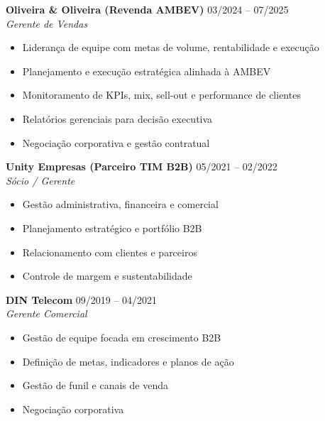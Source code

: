 \documentclass[11pt,a4paper]{article}
\begin{document}
\vspace{6pt}

\textbf{Oliveira \& Oliveira (Revenda AMBEV)} \hfill {\color{Muted}03/2024 -- 07/2025} \\
\textit{Gerente de Vendas}

\begin{itemize}[leftmargin=1.4em]
\item Liderança de equipe com metas de volume, rentabilidade e execução
\item Planejamento e execução estratégica alinhada à AMBEV
\item Monitoramento de KPIs, mix, sell-out e performance de clientes
\item Relatórios gerenciais para decisão executiva
\item Negociação corporativa e gestão contratual
\end{itemize}

\vspace{6pt}

\textbf{Unity Empresas (Parceiro TIM B2B)} \hfill {\color{Muted}05/2021 -- 02/2022} \\
\textit{Sócio / Gerente}

\begin{itemize}[leftmargin=1.4em]
\item Gestão administrativa, financeira e comercial
\item Planejamento estratégico e portfólio B2B
\item Relacionamento com clientes e parceiros
\item Controle de margem e sustentabilidade
\end{itemize}

\vspace{6pt}

\textbf{DIN Telecom} \hfill {\color{Muted}09/2019 -- 04/2021} \\
\textit{Gerente Comercial}

\begin{itemize}[leftmargin=1.4em]
\item Gestão de equipe focada em crescimento B2B
\item Definição de metas, indicadores e planos de ação
\item Gestão de funil e canais de venda
\item Negociação corporativa
\end{itemize}

\vspace{6pt}
\end{document}
